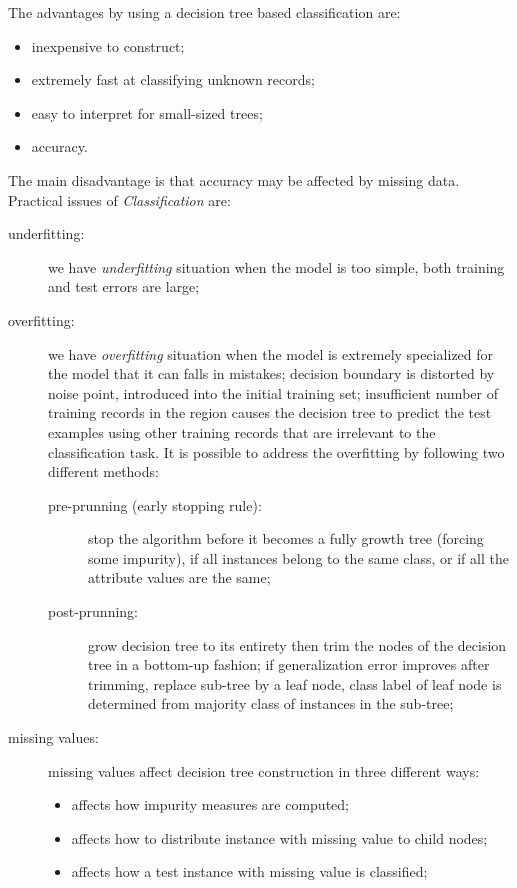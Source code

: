 The advantages by using a decision tree based classification are:
\begin{itemize}
	\item
	inexpensive to construct;
	\item
	extremely fast at classifying unknown records;
	\item
	easy to interpret for small-sized trees;
	\item
	accuracy.
\end{itemize}
The main disadvantage is that accuracy may be affected by missing data.
Practical issues of \emph{Classification} are:
\begin{description}
	\item[underfitting:] we have \emph{underfitting} situation when the model is too simple, both training and test errors are large;
	\item[overfitting:] we have \emph{overfitting} situation when the model is extremely specialized for the model that it can falls in mistakes; decision boundary is distorted by noise point, introduced into the initial training set; insufficient number of training records in the region causes the decision tree to predict the test examples using other training records that are irrelevant to the classification task.
	It is possible to address the overfitting by following two different methods:
	\begin{description}
		\item[pre-prunning (early stopping rule):] stop the algorithm before it becomes a fully growth tree (forcing some impurity), if all instances belong to the same class, or if all the attribute values are the same;
		\item[post-prunning:] grow decision tree to its entirety then trim the nodes of the decision tree in a bottom-up fashion; if generalization error improves after trimming, replace sub-tree by a leaf node, class label of leaf node is determined from majority class of instances in the sub-tree;
	\end{description}
	\item[missing values:] missing values affect decision tree construction in three different ways:
	\begin{itemize}
		\item
		affects how impurity measures are computed;
		\item
		affects how to distribute instance with missing value to child nodes;
		\item
		affects how a test instance with missing value is classified;

\end{itemize}
\end{description}
